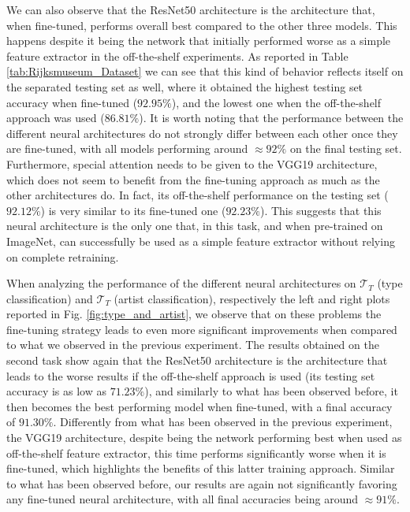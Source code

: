 We can also observe that the ResNet50 architecture is the architecture that, when fine-tuned, performs overall best compared to the other three models. This happens despite it being the network that initially performed worse as a simple feature extractor in the off-the-shelf experiments. As reported in Table \ref{tab:Rijksmuseum_Dataset} we can see that this kind of behavior reflects itself on the separated testing set as well, where it obtained the highest testing set accuracy when fine-tuned ($92.95\%$), and the lowest one when the off-the-shelf approach was used ($86.81\%$). It is worth noting that the performance between the different neural architectures do not strongly differ between each other once they are fine-tuned, with all models performing around $\approx 92\%$ on the final testing set. Furthermore, special attention needs to be given to the VGG19 architecture, which does not seem to benefit from the fine-tuning approach as much as the other architectures do. In fact, its off-the-shelf performance on the testing set ($92.12\%$) is very similar to its fine-tuned one ($92.23\%$). This suggests that this neural architecture is the only one that, in this task, and when pre-trained on ImageNet, can successfully be used as a simple feature extractor without relying on complete retraining. 

When analyzing the performance of the different neural architectures on $\mathcal{T}_T$  (type classification) and $\mathcal{T}_T$  (artist classification), respectively the left and right plots reported in Fig. \ref{fig:type_and_artist}, we observe that on these problems the fine-tuning strategy leads to even more significant improvements when compared to what we observed in the previous experiment. The results obtained on the second task show again that the ResNet50 architecture is the architecture that leads to the worse results if the off-the-shelf approach is used (its testing set accuracy is as low as $71.23\%$), and similarly to what has been observed before, it then becomes the best performing model when fine-tuned, with a final accuracy of $91.30\%$. Differently from what has been observed in the previous experiment, the VGG19 architecture, despite being the network performing best when used as off-the-shelf feature extractor, this time performs significantly worse when it is fine-tuned, which highlights the benefits of this latter training approach. Similar to what has been observed before, our results are again not significantly favoring any fine-tuned neural architecture, with all final accuracies being around $\approx 91\%$.

